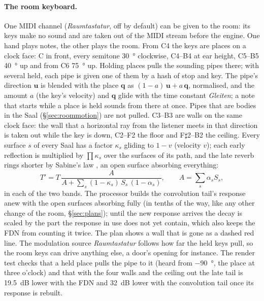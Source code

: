 \documentclass[11pt,a4paper,parskip=half,DIV=11,toc=bibliography]{scrartcl}
\newcommand{\ui}[1]{\emph{#1}}                 %
\begin{document}
\paragraph{The room keyboard.} One MIDI channel (\ui{Raumtastatur}, off by default) can be given to the room: its keys make no sound and
are taken out of the MIDI stream before the engine. One hand plays notes, the other plays the room. From C4 the keys are places on a clock
face: C in front, every semitone \SI{30}{\degree} clockwise, C4--B4 at ear height, C5--B5 \SI{40}{\degree} up and from C6
\SI{75}{\degree} up. Holding places pulls the sounding pipes there; with several held, each pipe is given one of them by a hash of stop and
key. The pipe's direction $\mathbf u$ is blended with the place $\mathbf q$ as $(1-a)\,\mathbf u + a\,\mathbf q$, normalised, and the amount
$a$ (the key's velocity) and $\mathbf q$ glide with the time constant \ui{Gleiten}; a note that starts while a place is held sounds from
there at once. Pipes that are bodies in the Saal (\S\ref{sec:roommotion}) are not pulled. C3--B3 are walls on the same clock face: the
wall that a horizontal ray from the listener meets in that direction is taken out while the key is down, C2--F2 the floor and F$\sharp$2--B2
the ceiling. Every surface $s$ of every Saal has a factor $\kappa_s$ gliding to $1-v$ (velocity $v$); each early reflection is multiplied
by $\prod\kappa_s$ over the surfaces of its path, and the late reverb rings shorter by Sabine's law \citep{kuttruff2016}, an open surface
absorbing everything:
\[ T' = T\,\frac{A}{A + \sum_s (1-\kappa_s)\,S_s\,(1-\alpha_s)},\qquad A = \sum_s \alpha_s S_s, \]
in each of the two bands. The processor builds the convolution tail's response anew with the open surfaces absorbing fully (in tenths of
the way, like any other change of the room, \S\ref{sec:plans}); until the new response arrives the decay is scaled by the part the
response in use does not yet contain, which also keeps the FDN from counting it twice. The plan shows a wall that
is gone as a dashed red line. The modulation source \ui{Raumtastatur} follows how far the held keys pull, so the room keys can drive
anything else, a door's opening for instance. The render test checks that a held place pulls the pipe to it (heard from
\SI{-90}{\degree}, the place at three o'clock) and that with the four walls and the ceiling out the late tail is \SI{19.5}{dB} lower
with the FDN and \SI{32}{dB} lower with the convolution tail once its response is rebuilt.

\end{document}
